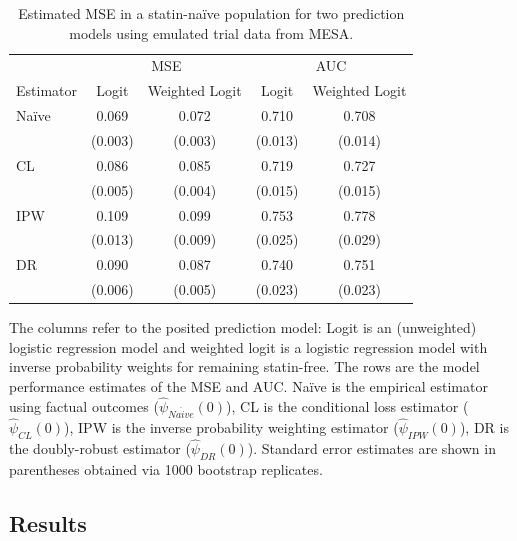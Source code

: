 \begin{table}[t]
    \centering
    \caption{Estimated MSE in a statin-na\"{i}ve population for two prediction models using emulated trial data from MESA.}
    \begin{threeparttable}
        \begin{tabular}{lcccc}
        \toprule
        \multicolumn{1}{c}{ } & \multicolumn{2}{c}{MSE} & \multicolumn{2}{c}{AUC} \\
        \cmidrule(l{3pt}r{3pt}){2-3} \cmidrule(l{3pt}r{3pt}){4-5}
        Estimator & Logit & Weighted Logit & Logit & Weighted Logit\\
        \midrule
        Na\"{i}ve & 0.069 & 0.072 & 0.710 & 0.708\\
         & (0.003) & (0.003) & (0.013) & (0.014)\\
        CL & 0.086 & 0.085 & 0.719 & 0.727\\
         & (0.005) & (0.004) & (0.015) & (0.015)\\
        IPW & 0.109 & 0.099 & 0.753 & 0.778\\
         & (0.013) & (0.009) & (0.025) & (0.029)\\
        DR & 0.090 & 0.087 & 0.740 & 0.751\\
         & (0.006) & (0.005) & (0.023) & (0.023)\\
        \bottomrule
        \end{tabular}
        \centering
        \begin{tablenotes}[flushleft]
        \item The columns refer to the posited prediction model: Logit is an (unweighted) logistic regression model and weighted logit is a logistic regression model with inverse probability weights for remaining statin-free. The rows are the model performance estimates of the MSE and AUC. Na\"{i}ve is the empirical estimator using factual outcomes ($\widehat{\psi}_{Na\ddot{i}ve}(0)$), CL is the conditional loss estimator ($\widehat{\psi}_{CL}(0)$), IPW is the inverse probability weighting estimator ($\widehat{\psi}_{IPW}(0)$), DR is the doubly-robust estimator ($\widehat{\psi}_{DR}(0)$). Standard error estimates are shown in parentheses obtained via 1000 bootstrap replicates.
        \end{tablenotes}
        \end{threeparttable}
\end{table}

\subsection{Results}

